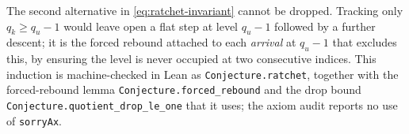 \begin{remark}
The second alternative in \eqref{eq:ratchet-invariant} cannot be dropped. Tracking only $q_k\ge q_u-1$ would leave open a flat step at level $q_u-1$ followed by a further descent; it is the forced rebound attached to each \emph{arrival} at $q_u-1$ that excludes this, by ensuring the level is never occupied at two consecutive indices. This induction is machine-checked in Lean as \texttt{Conjecture.ratchet}, together with the forced-rebound lemma \texttt{Conjecture.forced\_rebound} and the drop bound \texttt{Conjecture.quotient\_drop\_le\_one} that it uses; the axiom audit reports no use of \texttt{sorryAx}.
\end{remark}
